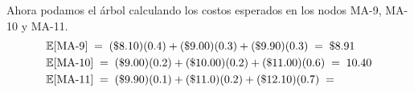\documentclass[ a4paper, twoside, 11pt]{article}
\begin{document}
Ahora podamos el \'arbol calculando los costos esperados en los nodos MA-9, MA-10 y MA-11. 
\begin{align*}
& \mathbb{E}[\text{MA-9}] \; = \; 
(\$8.10)(0.4) + (\$9.00)(0.3) + (\$9.90)(0.3)
\; = \; \$8.91 \\
& \mathbb{E}[\text{MA-10}] \; = \; 
(\$9.00)(0.2) + (\$10.00)(0.2) + (\$11.00)(0.6)
\; = \; 10.40 \\
& \mathbb{E}[\text{MA-11}] \; = \; 
(\$9.90)(0.1) + (\$11.0)(0.2) + (\$12.10)(0.7) \; = \; 
\end{align*}
\end{document}
